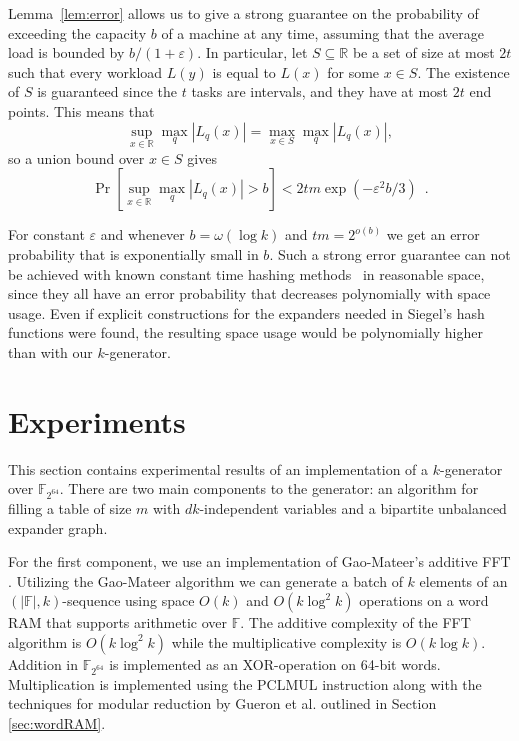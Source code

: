 \documentclass[a4paper,11pt]{article}
\theoremstyle{plain}
\theoremstyle{definition}
\newcommand{\F}{\mathbb{F}}
\newcommand{\R}{\mathbb{R}}
\begin{document}
Lemma~\ref{lem:error} allows us to give a strong guarantee on the probability of exceeding the capacity $b$ of a machine at any time, assuming that the average load is bounded by $b/(1+\varepsilon)$.
In particular, let $S\subseteq\R$ be a set of size at most $2t$ such that every workload $L(y)$ is equal to $L(x)$ for some $x\in S$.
The existence of $S$ is guaranteed since the $t$ tasks are intervals, and they have at most $2t$ end points.
This means that
$$\sup_{x\in\R} \max_q |L_q(x)| = \max_{x\in S} \max_q |L_q(x)|,$$
so a union bound over $x\in S$ gives
$$\Pr[\sup_{x\in\R} \max_q |L_q(x)| > b] < 2tm \exp(-\varepsilon^2 b / 3) \enspace .$$

For constant $\varepsilon$ and whenever $b = \omega(\log k)$ and $tm = 2^{o(b)}$ we get an error probability that is exponentially small in $b$.
Such a strong error guarantee can not be achieved with known constant time hashing methods~\cite{siegel2004,pagh2008,dietzfelbinger2003,thorup2013} in reasonable space, since they all have an error probability that decreases polynomially with space usage.
Even if explicit constructions for the expanders needed in Siegel's hash functions were found, the resulting space usage would be polynomially higher than with our $k$-generator.
\section{Experiments} \label{sec:experiments}
This section contains experimental results of an implementation of a $k$-generator over $\F_{2^{64}}$. 
There are two main components to the generator: an algorithm for filling a table of size $m$ with $dk$-independent variables and a bipartite unbalanced expander graph.

For the first component, we use an implementation of Gao-Mateer's additive FFT \cite[Algorithm 2.]{gao2010}.
Utilizing the Gao-Mateer algorithm we can generate a batch of $k$ elements of an $(|\F|, k)$-sequence using space $O(k)$ and $O(k \log^{2} k)$ operations on a word RAM that supports arithmetic over $\F$.
The additive complexity of the FFT algorithm is $O(k \log^{2} k)$ while the multiplicative complexity is $O(k \log k)$.
Addition in $\F_{2^{64}}$ is implemented as an XOR-operation on 64-bit words. 
Multiplication is implemented using the PCLMUL instruction along with the techniques for modular reduction by Gueron et
al. \cite{gueron2014} outlined in Section \ref{sec:wordRAM}.
\end{document}
